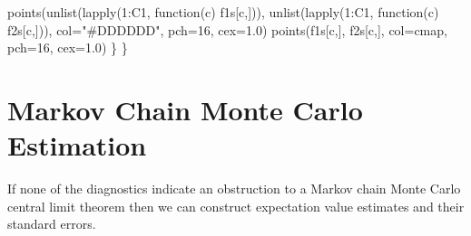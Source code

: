 \documentclass[
  letterpaper,
  DIV=11,
  numbers=noendperiod]{scrartcl}
\newenvironment{Shaded}{\begin{snugshade}}{\end{snugshade}}
\newcommand{\AttributeTok}[1]{\textcolor[rgb]{0.40,0.45,0.13}{#1}}
\newcommand{\ControlFlowTok}[1]{\textcolor[rgb]{0.00,0.23,0.31}{#1}}
\newcommand{\DecValTok}[1]{\textcolor[rgb]{0.68,0.00,0.00}{#1}}
\newcommand{\FloatTok}[1]{\textcolor[rgb]{0.68,0.00,0.00}{#1}}
\newcommand{\FunctionTok}[1]{\textcolor[rgb]{0.28,0.35,0.67}{#1}}
\newcommand{\NormalTok}[1]{\textcolor[rgb]{0.00,0.23,0.31}{#1}}
\newcommand{\SpecialCharTok}[1]{\textcolor[rgb]{0.37,0.37,0.37}{#1}}
\newcommand{\StringTok}[1]{\textcolor[rgb]{0.13,0.47,0.30}{#1}}
\begin{document}
\begin{Shaded}
\begin{Highlighting}[]
    \FunctionTok{points}\NormalTok{(}\FunctionTok{unlist}\NormalTok{(}\FunctionTok{lapply}\NormalTok{(}\DecValTok{1}\SpecialCharTok{:}\NormalTok{C1, }\ControlFlowTok{function}\NormalTok{(c) f1s[c,])),}
           \FunctionTok{unlist}\NormalTok{(}\FunctionTok{lapply}\NormalTok{(}\DecValTok{1}\SpecialCharTok{:}\NormalTok{C1, }\ControlFlowTok{function}\NormalTok{(c) f2s[c,])),}
           \AttributeTok{col=}\StringTok{"\#DDDDDD"}\NormalTok{, }\AttributeTok{pch=}\DecValTok{16}\NormalTok{, }\AttributeTok{cex=}\FloatTok{1.0}\NormalTok{)}
    \FunctionTok{points}\NormalTok{(f1s[c,], f2s[c,], }\AttributeTok{col=}\NormalTok{cmap, }\AttributeTok{pch=}\DecValTok{16}\NormalTok{, }\AttributeTok{cex=}\FloatTok{1.0}\NormalTok{)}
\NormalTok{  \}}
\NormalTok{\}}
\end{Highlighting}
\end{Shaded}

\hypertarget{markov-chain-monte-carlo-estimation}{%
\section{Markov Chain Monte Carlo
Estimation}\label{markov-chain-monte-carlo-estimation}}

If none of the diagnostics indicate an obstruction to a Markov chain
Monte Carlo central limit theorem then we can construct expectation
value estimates and their standard errors.
\end{document}
